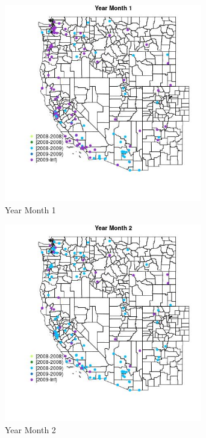 \begin{figure} 
\centering  
\includegraphics[width=0.77\textwidth]{Code_Outputs/Report_ML_input_PM25_Step4_part_e_de_duplicated_aves_MapObsMo1Year.jpg} 
\caption{\label{fig:Report_ML_input_PM25_Step4_part_e_de_duplicated_avesMapObsMo1Year}Year Month 1} 
\end{figure} 
 

\begin{figure} 
\centering  
\includegraphics[width=0.77\textwidth]{Code_Outputs/Report_ML_input_PM25_Step4_part_e_de_duplicated_aves_MapObsMo2Year.jpg} 
\caption{\label{fig:Report_ML_input_PM25_Step4_part_e_de_duplicated_avesMapObsMo2Year}Year Month 2} 
\end{figure} 
 

